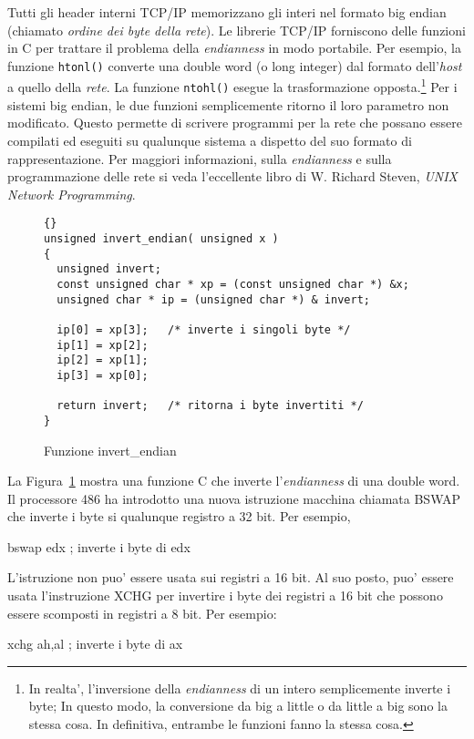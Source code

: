 Tutti gli header interni TCP/IP memorizzano gli interi nel formato
big endian (chiamato \emph{ordine dei byte della rete}). Le librerie
TCP/IP forniscono delle funzioni in C per trattare il
problema della \emph{endianness} in modo portabile. Per esempio, la
funzione \lstinline|htonl()| converte una double word (o long integer)
dal formato dell'\emph{host} a quello della \emph{rete}. La funzione
\lstinline|ntohl()| esegue la trasformazione opposta.\footnote{In realta',
l'inversione della \emph{endianness} di un intero semplicemente inverte
i byte; In questo modo, la conversione da big a little o da little a big
sono la stessa cosa. In definitiva, entrambe le funzioni fanno la stessa
cosa.} Per i sistemi big endian, le due funzioni semplicemente ritorno 
il loro parametro non modificato. Questo permette di scrivere programmi
per la rete che possano essere compilati ed eseguiti su qualunque
sistema a dispetto del suo formato di rappresentazione. Per maggiori
informazioni, sulla \emph{endianness} e sulla programmazione delle
rete si veda l'eccellente libro di W. Richard Steven, 
\emph{UNIX Network Programming}.

\begin{figure}[t]
\begin{lstlisting}[frame=tlrb]{}
unsigned invert_endian( unsigned x )
{
  unsigned invert;
  const unsigned char * xp = (const unsigned char *) &x;
  unsigned char * ip = (unsigned char *) & invert;

  ip[0] = xp[3];   /* inverte i singoli byte */
  ip[1] = xp[2];
  ip[2] = xp[1];
  ip[3] = xp[0];

  return invert;   /* ritorna i byte invertiti */
}
\end{lstlisting}
\caption{Funzione invert\_endian \label{fig:invertEndian}}
\end{figure}

La Figura~\ref{fig:invertEndian} mostra una funzione C che inverte
l'\emph{endianness} di una double word. Il processore 486 ha introdotto
una nuova istruzione macchina chiamata {\code BSWAP}  che
inverte i byte si qualunque registro a 32 bit. Per esempio,
\begin{AsmCodeListing}[frame=none,numbers=none]
      bswap   edx          ; inverte i byte di edx
\end{AsmCodeListing}
L'istruzione non puo' essere usata sui registri a 16 bit. Al suo posto,
puo' essere usata l'instruzione {\code XCHG}  per invertire
i byte dei registri a 16 bit che possono essere scomposti in registri
a 8 bit. Per esempio:
\begin{AsmCodeListing}[frame=none,numbers=none]
      xchg    ah,al        ; inverte i byte di ax
\end{AsmCodeListing}

